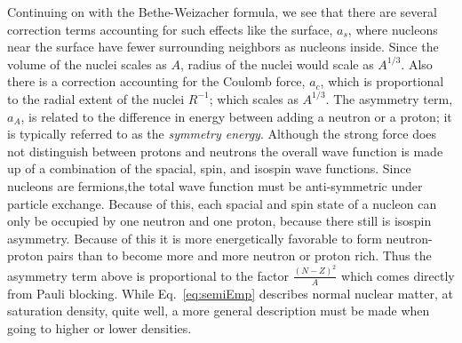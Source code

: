 Continuing on with the Bethe-Weizacher formula, we see that there are several correction terms accounting for such effects like the surface, $a_s$, where nucleons near the surface have fewer surrounding neighbors as nucleons inside. Since the volume of the nuclei scales as $A$, radius of the nuclei would scale as $A^{1/3}$. Also there is a correction accounting for the Coulomb force, $a_c$, which is proportional to the radial extent of the nuclei $R^{-1}$; which scales as $A^{1/3}$. The asymmetry term, $a_A$, is related to the difference in energy between adding a neutron or a proton; it is typically referred to as the \emph{symmetry energy}. Although the strong force does not distinguish between protons and neutrons the overall wave function is made up of a combination of the spacial, spin, and isospin wave functions. Since nucleons are fermions,the total wave function must be anti-symmetric under particle exchange. Because of this, each spacial and spin state of a nucleon can only be occupied by one neutron and one proton, because there still is isospin asymmetry.  Because of this it is more energetically favorable to form neutron-proton pairs than to become more and more neutron or proton rich. Thus the asymmetry term above is proportional to the factor $\frac{(N - Z)^2}{A}$ which comes directly from Pauli blocking. While Eq.~\ref{eq:semiEmp} describes normal nuclear matter, at saturation density, quite well, a more general description must be made when going to higher or lower densities. 


